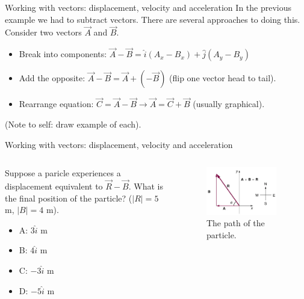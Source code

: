 \documentclass{beamer}
\begin{document}
\begin{frame}{Working with vectors: displacement, velocity and acceleration}
In the previous example we had to subtract vectors.  There are several approaches to doing this.  Consider two vectors $\vec{A}$ and $\vec{B}$.\\
\begin{itemize}
\item Break into components: $\vec{A}-\vec{B} = \hat{i}(A_x-B_x) + \hat{j}(A_y-B_y)$
\item Add the opposite: $\vec{A}-\vec{B} = \vec{A}+(-\vec{B})$ (flip one vector head to tail).
\item Rearrange equation: $\vec{C} = \vec{A}-\vec{B} \rightarrow \vec{A} = \vec{C}+\vec{B}$ (usually graphical).
\end{itemize}
\small (Note to self: draw example of each).
\end{frame}

\begin{frame}{Working with vectors: displacement, velocity and acceleration}
\begin{columns}[T]
\begin{column}{0.5\textwidth}
\small Suppose a paricle experiences a displacement equivalent to $\vec{R}-\vec{B}$.  What is the final position of the particle?  ($|R| = 5$ m, $|B| = 4$ m).
\begin{itemize}
\item A: $3\hat{i}$ m
\item B: $4\hat{i}$ m
\item C: $-3\hat{i}$ m
\item D: $-5\hat{i}$ m
\end{itemize}
\end{column}
\begin{column}{0.5\textwidth}
\begin{figure}
\centering
\includegraphics[width=0.9\textwidth]{figures/vecdiag.png}
\caption{\label{fig:vecdiag} The path of the particle.}
\end{figure}
\end{column}
\end{columns}
\end{frame}
\end{document}
